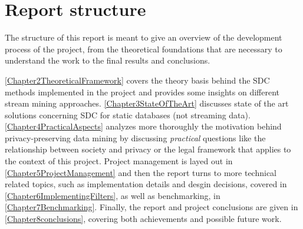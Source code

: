 \section{Report structure}
\label{Introduction::Structure}

The structure of this report is meant to give an overview of the development process of the project, from the theoretical foundations that are necessary to understand the work to the final results and conclusions.

\cref{Chapter2TheoreticalFramework} covers the theory basis behind the SDC methods implemented in the project and provides some insights on different stream mining approaches. \cref{Chapter3StateOfTheArt} discusses state of the art solutions concerning SDC for static databases (not streaming data). \cref{Chapter4PracticalAspects} analyzes more thoroughly the motivation behind privacy-preserving data mining by discussing \textit{practical} questions like the relationship between society and privacy or the legal framework that applies to the context of this project. Project management is layed out in \cref{Chapter5ProjectManagement} and then the report turns to more technical related topics, such as implementation details and desgin decisions, covered in \cref{Chapter6ImplementingFilters}, as well as benchmarking, in \cref{Chapter7Benchmarking}. Finally, the report and project conclusions are given in \cref{Chapter8conclusions}, covering both achievements and possible future work.
